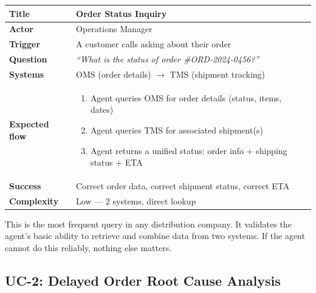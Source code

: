 \documentclass[11pt,a4paper]{article}
\begin{document}
\begin{table}[H]
\centering\small
\begin{tabularx}{\textwidth}{@{} l X @{}}
\toprule
\textbf{Title}       & Order Status Inquiry \\
\midrule
\textbf{Actor}       & Operations Manager \\
\textbf{Trigger}     & A customer calls asking about their order \\
\textbf{Question}    & \textit{``What is the status of order \#ORD-2024-0456?''} \\
\textbf{Systems}     & OMS (order details) $\to$ TMS (shipment tracking) \\
\textbf{Expected flow} &
    \begin{enumerate}[nosep,leftmargin=1.2em]
        \item Agent queries OMS for order details (status, items, dates)
        \item Agent queries TMS for associated shipment(s)
        \item Agent returns a unified status: order info + shipping status + ETA
    \end{enumerate} \\
\textbf{Success}     & Correct order data, correct shipment status, correct ETA \\
\textbf{Complexity}  & Low --- 2 systems, direct lookup \\
\bottomrule
\end{tabularx}
\end{table}

\begin{notebox}
This is the most frequent query in any distribution company. It validates the agent's basic ability to retrieve and combine data from two systems. If the agent cannot do this reliably, nothing else matters.
\end{notebox}

\subsection{UC-2: Delayed Order Root Cause Analysis}
\end{document}
